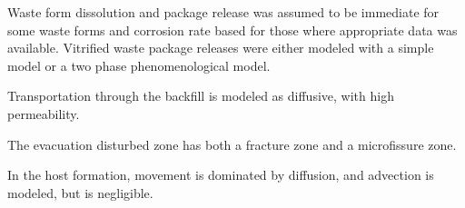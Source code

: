 









Waste form dissolution and package release was assumed to be immediate for some
waste forms and corrosion rate based for those where appropriate data was
available. Vitrified waste package releases were either modeled with a simple
model or a two phase phenomenological model. 


Transportation through the backfill is modeled as diffusive, with high
permeability.

The evacuation disturbed zone has both a fracture zone and a microfissure zone.

In the host formation, movement is dominated by diffusion, and advection is
modeled, but is negligible.



% 

